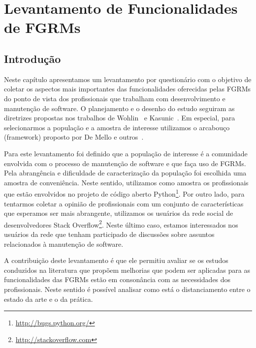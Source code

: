 \chapter{Levantamento de Funcionalidades de FGRMs}\label{ch:pesquisa-profissionais}

\section{Introdução}\label{sec:pesquisa-profissionais-intro}

Neste capítulo apresentamos um levantamento por questionário com o objetivo de
coletar os aspectos mais importantes das funcionalidades oferecidas pelas FGRMs
do ponto de vista dos profissionais que trabalham com desenvolvimento e
manutenção de software. O planejamento e o desenho do estudo seguiram as
diretrizes propostas nos trabalhos de Wohlin~\cite{wohlin2012experimentation} e
Kasunic~\cite{kasunic2005designing}. Em especial, para selecionarmos a
população e a amostra de interesse utilizamos o arcabouço (framework) proposto
por De Mello e outros~\cite{de2015investigating, de2014towards}.

Para este levantamento foi definido que a população de interesse é a comunidade
envolvida com o processo de manutenção de software e que faça uso de FGRMs.
Pela abrangência e dificuldade de caracterização da população foi escolhida uma
amostra de conveniência. Neste sentido, utilizamos como amostra os
profissionais que estão envolvidos no projeto de código aberto
Python\footnote{\url{http://bugs.python.org/}}. Por outro lado, para tentarmos
coletar a opinião de profissionais com um conjunto de características que
esperamos ser mais abrangente, utilizamos os usuários da rede social de
desenvolvedores Stack Overflow\footnote{\url{http://stackoverflow.com}}. Neste
último caso, estamos interessados nos usuários da rede que tenham participado
de discussões sobre assuntos relacionados à manutenção de software.

A contribuição deste levantamento é que ele permitiu avaliar se os estudos
conduzidos na literatura que propõem melhorias que podem ser aplicadas para as
funcionalidades das FGRMs estão em consonância com as necessidades dos
profissionais. Neste sentido é possível analisar como está o distanciamento
entre o estado da arte e o da prática.

